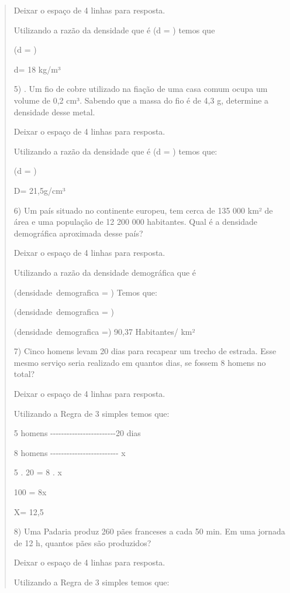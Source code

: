 \begin{quote}
\begin{escolha}
Deixar o espaço de 4 linhas para resposta.

Utilizando a razão da densidade que é (d = ) temos que

(d = )

d= 18 kg/m³

5) . Um fio de cobre utilizado na fiação de uma casa comum ocupa um
volume de 0,2 cm³. Sabendo que a massa do fio é de 4,3 g, determine a
densidade desse metal.

Deixar o espaço de 4 linhas para resposta.

Utilizando a razão da densidade que é (d = ) temos que:

(d = )

D= 21,5g/cm³

6) Um país situado no continente europeu, tem cerca de 135 000 km² de
área e uma população de 12 200 000 habitantes. Qual é a densidade
demográfica aproximada desse país?

Deixar o espaço de 4 linhas para resposta.

Utilizando a razão da densidade demográfica que é

(densidade\ demografica = )
Temos que:

(densidade\ demografica = )

(densidade\ demografica =) 90,37 Habitantes/ km²

7) Cinco homens levam 20 dias para recapear um trecho de estrada. Esse
mesmo serviço seria realizado em quantos dias, se fossem 8 homens no
total?

Deixar o espaço de 4 linhas para resposta.

Utilizando a Regra de 3 simples temos que:

5 homens
-\/-\/-\/-\/-\/-\/-\/-\/-\/-\/-\/-\/-\/-\/-\/-\/-\/-\/-\/-\/-\/-\/-\/-20
dias

8 homens
-\/-\/-\/-\/-\/-\/-\/-\/-\/-\/-\/-\/-\/-\/-\/-\/-\/-\/-\/-\/-\/-\/-\/-\/-
x

5 . 20 = 8 . x

100 = 8x

X= 12,5

8) Uma Padaria produz 260 pães franceses a cada 50 min. Em uma jornada
de 12 h, quantos pães são produzidos?

Deixar o espaço de 4 linhas para resposta.

Utilizando a Regra de 3 simples temos que:


\end{escolha}
\end{quote}
